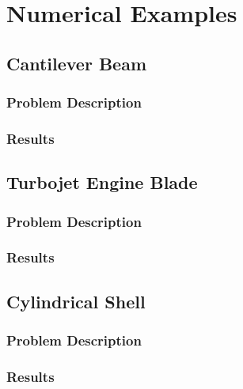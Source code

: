 \chapter{Numerical Examples}
\label{chapter:NumericalExamples}

\section{Cantilever Beam}
\subsection{Problem Description}
\subsection{Results}

\section{Turbojet Engine Blade}
\subsection{Problem Description}

\subsection{Results}

\section{Cylindrical Shell}
\subsection{Problem Description}


\subsection{Results}
